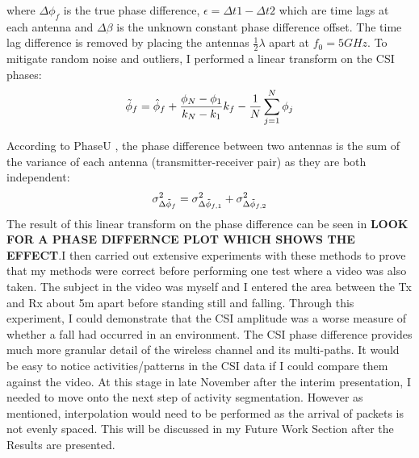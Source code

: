 where $\Delta\phi_{f}$ is the true phase difference, $\epsilon = \Delta t1 - \Delta t2$ which are time lags at each antenna and $\Delta\beta$ is the unknown constant phase difference offset. The time lag difference is removed by placing the antennas $\frac{1}{2}\lambda$ apart at $f_{0} = 5GHz$. To mitigate random noise and outliers, I performed a linear transform on the CSI phases: 
\vspace{-11pt}
\begin{equation}\label{eqn:3.5}
    \Tilde{\phi}_f = \hat{\phi}_{f}+\frac{\phi_{N}-\phi_{1}}{k_{N}-k_1}k_{f}-\frac{1}{N}\sum_{j=1}^{N} \phi_{j}
    \vspace{-11pt}
\end{equation} \par 
According to PhaseU \citep{PhaseU}, the phase difference between two antennas is the sum of the variance of each antenna (transmitter-receiver pair) as they are both independent:
\vspace{-11pt}
\begin{equation}\label{eqn:3.6}
    \sigma^{2}_{\Delta\Tilde{\phi}_f} = \sigma^{2}_{\Delta\Tilde{\phi}_{f,1}} + \sigma^{2}_{\Delta\Tilde{\phi}_{f,2}}
    \vspace{-11pt}
\end{equation} 
The result of this linear transform on the phase difference can be seen in \textbf{LOOK FOR A PHASE DIFFERNCE PLOT WHICH SHOWS THE EFFECT}.I then carried out extensive experiments with these methods to prove that my methods were correct before performing one test where a video was also taken. The subject in the video was myself and I entered the area between the Tx and Rx about 5m apart before standing still and falling. Through this experiment, I could demonstrate that the CSI amplitude was a worse measure of whether a fall had occurred in an environment. The CSI phase difference provides much more granular detail of the wireless channel and its multi-paths. It would be easy to notice activities/patterns in the CSI data if I could compare them against the video. At this stage in late November after the interim presentation, I needed to move onto the next step of activity segmentation. However as mentioned, interpolation would need to be performed as the arrival of packets is not evenly spaced. This will be discussed in my Future Work Section after the Results are presented. 

